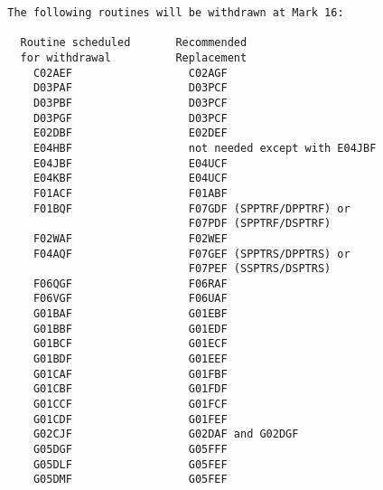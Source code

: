 \begin{small}
\begin{verbatim}
        The following routines will be withdrawn at Mark 16:                     
                                                                                 
          Routine scheduled       Recommended                                    
          for withdrawal          Replacement                                    
            C02AEF                  C02AGF                                       
            D03PAF                  D03PCF                                       
            D03PBF                  D03PCF                                       
            D03PGF                  D03PCF                                       
            E02DBF                  E02DEF                                       
            E04HBF                  not needed except with E04JBF                
            E04JBF                  E04UCF                                       
            E04KBF                  E04UCF                                       
            F01ACF                  F01ABF                                       
            F01BQF                  F07GDF (SPPTRF/DPPTRF) or                    
                                    F07PDF (SPPTRF/DSPTRF)                       
            F02WAF                  F02WEF                                       
            F04AQF                  F07GEF (SPPTRS/DPPTRS) or                    
                                    F07PEF (SSPTRS/DSPTRS)                       
            F06QGF                  F06RAF                                       
            F06VGF                  F06UAF                                       
            G01BAF                  G01EBF                                       
            G01BBF                  G01EDF                                       
            G01BCF                  G01ECF                                       
            G01BDF                  G01EEF                                       
            G01CAF                  G01FBF                                       
            G01CBF                  G01FDF                                       
            G01CCF                  G01FCF                                       
            G01CDF                  G01FEF                                       
            G02CJF                  G02DAF and G02DGF                            
            G05DGF                  G05FFF                                       
            G05DLF                  G05FEF                                       
            G05DMF                  G05FEF                                       

\end{verbatim}
\end{small}
